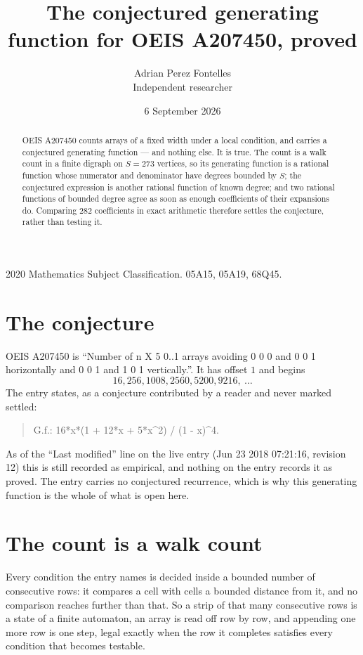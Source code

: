 \documentclass[11pt,a4paper]{article}
\title{The conjectured generating function for OEIS A207450, proved}
\author{Adrian Perez Fontelles\\ \small Independent researcher}
\date{6 September 2026}
\theoremstyle{plain}
\theoremstyle{definition}
\begin{document}
\maketitle

\begin{abstract}
OEIS A207450 counts arrays of a fixed width under a local condition, and carries a conjectured
generating function --- and nothing else. It is true. The count is a walk count in a finite
digraph on $S=273$ vertices, so its generating function is a rational function whose numerator
and denominator have degrees bounded by $S$; the conjectured expression is another rational
function of known degree; and two rational functions of bounded degree agree as soon as enough
coefficients of their expansions do. Comparing $282$ coefficients in exact arithmetic
therefore settles the conjecture, rather than testing it.
\end{abstract}

\noindent\small 2020 Mathematics Subject Classification. 05A15, 05A19, 68Q45.\normalsize

\section{The conjecture}

OEIS A207450 is ``Number of n X 5 0..1 arrays avoiding 0 0 0 and 0 0 1 horizontally and 0 0 1 and 1 0 1 vertically.''. It has offset $1$ and begins
\[
16, 256, 1008, 2560, 5200, 9216,\ \dots
\]
The entry states, as a conjecture contributed by a reader and never marked settled:
\begin{quote}
G.f.: 16*x*(1 + 12*x + 5*x\^{}2) / (1 - x)\^{}4.
\end{quote}
As of the ``Last modified'' line on the live entry (Jun 23 2018 07:21:16, revision 12) this is still
recorded as empirical, and nothing on the entry records it as proved. The entry carries no
conjectured recurrence, which is why this generating function is the whole of what is open
here.

\section{The count is a walk count}

Every condition the entry names is decided inside a bounded number of consecutive rows: it
compares a cell with cells a bounded distance from it, and no comparison reaches further than
that. So a strip of that many consecutive rows is a state of a finite automaton, an array is
read off row by row, and appending one more row is one step, legal exactly when the row it
completes satisfies every condition that becomes testable.
\end{document}
